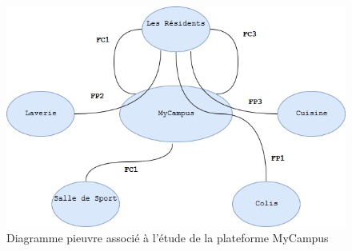 \documentclass[12pt]{report}
\begin{document}
\begin{figure}[]
\begin{center}
\includegraphics[scale=0.5]{diagramme_pieuvre.png}
\caption{Diagramme pieuvre associé à l'étude de la plateforme MyCampus}
\end{center}
\end{figure}
\end{document}
